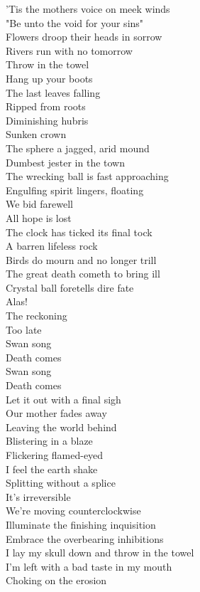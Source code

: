 'Tis the mothers voice on meek winds \\
"Be unto the void for your sins" \\
Flowers droop their heads in sorrow \\
Rivers run with no tomorrow \\

Throw in the towel \\
Hang up your boots \\
The last leaves falling \\
Ripped from roots \\
Diminishing hubris \\
Sunken crown \\
The sphere a jagged, arid mound \\
Dumbest jester in the town \\
The wrecking ball is fast approaching \\
Engulfing spirit lingers, floating \\
We bid farewell \\
All hope is lost \\
The clock has ticked its final tock \\
A barren lifeless rock \\

Birds do mourn and no longer trill \\
The great death cometh to bring ill \\
Crystal ball foretells dire fate \\
Alas! \\
The reckoning \\
Too late \\

Swan song \\
Death comes \\
Swan song \\
Death comes \\

Let it out with a final sigh \\
Our mother fades away \\
Leaving the world behind \\
Blistering in a blaze \\
Flickering flamed-eyed \\
I feel the earth shake \\
Splitting without a splice \\
It's irreversible \\
We're moving counterclockwise \\
Illuminate the finishing inquisition \\
Embrace the overbearing inhibitions \\
I lay my skull down and throw in the towel \\
I'm left with a bad taste in my mouth \\
Choking on the  erosion \\

